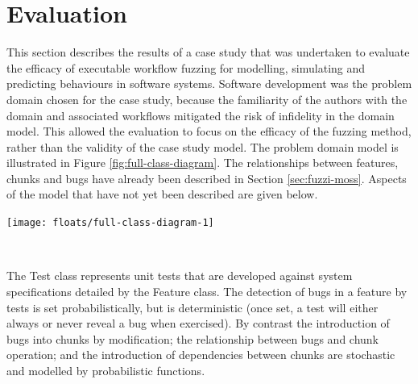 \documentclass{sig-alternate}
\begin{document}

\section{Evaluation}
\label{sec:evaluation}


This section describes the results of a case study that was undertaken to
evaluate the efficacy of executable workflow fuzzing for modelling, simulating
and predicting behaviours in software systems.  Software development was the
problem domain chosen for the case study, because the familiarity of the authors
with the domain and associated workflows mitigated the risk of infidelity in the
domain model.  This allowed the evaluation to focus on the efficacy of the
fuzzing method, rather than the validity of the case study model. The problem
domain model is illustrated in Figure \ref{fig:full-class-diagram}.  The
relationships between features, chunks and bugs have already been described in
Section \ref{sec:fuzzi-moss}.  Aspects of the model that have not yet been
described are given below.

\begin{figure*}
  \centering
  \texttt{[image: floats/full-class-diagram-1]}
  \

  \

  \caption{Full class diagram of the software development problem domain.}
  \label{fig:full-class-diagram}
\end{figure*}


The Test class represents unit tests that are developed against system
specifications detailed by the Feature class.  The detection of bugs in a
feature by tests is set probabilistically, but is deterministic (once set, a
test will either always or never reveal a bug when exercised).  By contrast the
introduction of bugs into chunks by modification; the relationship between bugs
and chunk operation; and the introduction of dependencies between chunks are
stochastic and modelled by probabilistic functions.
\end{document}
